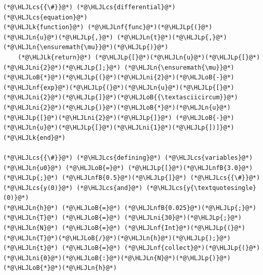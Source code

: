 \documentclass[12pt,a4paper]{article}
\newcommand{\HLJLk}[1]{\textcolor[RGB]{148,91,176}{\textbf{#1}}}
\newcommand{\HLJLn}[1]{#1}
\newcommand{\HLJLnf}[1]{\textcolor[RGB]{66,102,213}{#1}}
\newcommand{\HLJLnfB}[1]{\textcolor[RGB]{59,151,46}{#1}}
\newcommand{\HLJLni}[1]{\textcolor[RGB]{59,151,46}{#1}}
\newcommand{\HLJLoB}[1]{\textcolor[RGB]{102,102,102}{\textbf{#1}}}
\newcommand{\HLJLp}[1]{#1}
\newcommand{\HLJLcs}[1]{\textcolor[RGB]{153,153,119}{\textit{#1}}}
\begin{document}
\begin{lstlisting}
(*@\HLJLcs{{\#}}@*) (*@\HLJLcs{differential}@*) (*@\HLJLcs{equation}@*)
(*@\HLJLk{function}@*) (*@\HLJLnf{func}@*)(*@\HLJLp{(}@*)(*@\HLJLn{u}@*)(*@\HLJLp{,}@*) (*@\HLJLn{t}@*)(*@\HLJLp{,}@*) (*@\HLJLn{\ensuremath{\mu}}@*)(*@\HLJLp{)}@*)
    (*@\HLJLk{return}@*) (*@\HLJLp{[}@*)(*@\HLJLn{u}@*)(*@\HLJLp{[}@*)(*@\HLJLni{2}@*)(*@\HLJLp{];}@*) (*@\HLJLn{\ensuremath{\mu}}@*)(*@\HLJLoB{*}@*)(*@\HLJLp{(}@*)(*@\HLJLni{2}@*)(*@\HLJLoB{-}@*)(*@\HLJLnf{exp}@*)(*@\HLJLp{(}@*)(*@\HLJLn{u}@*)(*@\HLJLp{[}@*)(*@\HLJLni{2}@*)(*@\HLJLp{]}@*)(*@\HLJLoB{{\textasciicircum}}@*)(*@\HLJLni{2}@*)(*@\HLJLp{)}@*)(*@\HLJLoB{*}@*)(*@\HLJLn{u}@*)(*@\HLJLp{[}@*)(*@\HLJLni{2}@*)(*@\HLJLp{]}@*) (*@\HLJLoB{-}@*) (*@\HLJLn{u}@*)(*@\HLJLp{[}@*)(*@\HLJLni{1}@*)(*@\HLJLp{])]}@*)
(*@\HLJLk{end}@*)

(*@\HLJLcs{{\#}}@*) (*@\HLJLcs{defining}@*) (*@\HLJLcs{variables}@*)
(*@\HLJLn{u0}@*) (*@\HLJLoB{=}@*) (*@\HLJLp{[}@*)(*@\HLJLnfB{3.0}@*)(*@\HLJLp{;}@*) (*@\HLJLnfB{0.5}@*)(*@\HLJLp{]}@*) (*@\HLJLcs{{\#}}@*) (*@\HLJLcs{y(0)}@*) (*@\HLJLcs{and}@*) (*@\HLJLcs{y{\textquotesingle}(0)}@*)
(*@\HLJLn{h}@*) (*@\HLJLoB{=}@*) (*@\HLJLnfB{0.025}@*)(*@\HLJLp{;}@*) (*@\HLJLn{T}@*) (*@\HLJLoB{=}@*) (*@\HLJLni{30}@*)(*@\HLJLp{;}@*)
(*@\HLJLn{N}@*) (*@\HLJLoB{=}@*) (*@\HLJLnf{Int}@*)(*@\HLJLp{(}@*)(*@\HLJLn{T}@*)(*@\HLJLoB{/}@*)(*@\HLJLn{h}@*)(*@\HLJLp{);}@*)
(*@\HLJLn{t}@*) (*@\HLJLoB{=}@*) (*@\HLJLnf{collect}@*)(*@\HLJLp{(}@*)(*@\HLJLni{0}@*)(*@\HLJLoB{:}@*)(*@\HLJLn{N}@*)(*@\HLJLp{)}@*)(*@\HLJLoB{*}@*)(*@\HLJLn{h}@*)


\end{lstlisting}
\end{document}
